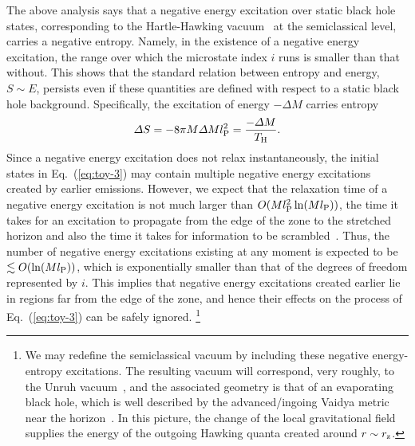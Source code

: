 \documentclass[12pt]{article}
\begin{document}
The above analysis says that a negative energy excitation over 
static black hole states, corresponding to the Hartle-Hawking 
vacuum~\cite{Hartle:1976tp} at the semiclassical level, carries 
a negative entropy.  Namely, in the existence of a negative energy 
excitation, the range over which the microstate index $i$ runs is 
smaller than that without.  This shows that the standard relation 
between entropy and energy, $S \sim E$, persists even if these 
quantities are defined with respect to a static black hole 
background.  Specifically, the excitation of energy $-\varDelta M$ 
carries entropy
%
\begin{equation}
  \varDelta S = -8\pi M \varDelta M l_{\rm P}^2 
  = \frac{-\varDelta M}{T_{\rm H}}.
\label{eq:neg-S}
\end{equation}
%
Since a negative energy excitation does not relax instantaneously, 
the initial states in Eq.~(\ref{eq:toy-3}) may contain multiple 
negative energy excitations created by earlier emissions.  However, 
we expect that the relaxation time of a negative energy excitation 
is not much larger than $O(M l_{\rm P}^2 \ln(M l_{\rm P}))$, the 
time it takes for an excitation to propagate from the edge of 
the zone to the stretched horizon and also the time it takes for 
information to be scrambled~\cite{Hayden:2007cs,Sekino:2008he}. 
Thus, the number of negative energy excitations existing at any 
moment is expected to be $\lesssim O(\ln(M l_{\rm P}))$, which is 
exponentially smaller than that of the degrees of freedom 
represented by $i$.  This implies that negative energy excitations 
created earlier lie in regions far from the edge of the zone, 
and hence their effects on the process of Eq.~(\ref{eq:toy-3}) 
can be safely ignored.%
\footnote{We may redefine the semiclassical vacuum by including 
 these negative energy-entropy excitations.  The resulting 
 vacuum will correspond, very roughly, to the Unruh 
 vacuum~\cite{Unruh:1976db}, and the associated geometry 
 is that of an evaporating black hole, which is well 
 described by the advanced/ingoing Vaidya metric near the 
 horizon~\cite{Bardeen:1981zz}.  In this picture, the change 
 of the local gravitational field supplies the energy of the 
 outgoing Hawking quanta created around $r \sim r_{\rm z}$.}
\end{document}
